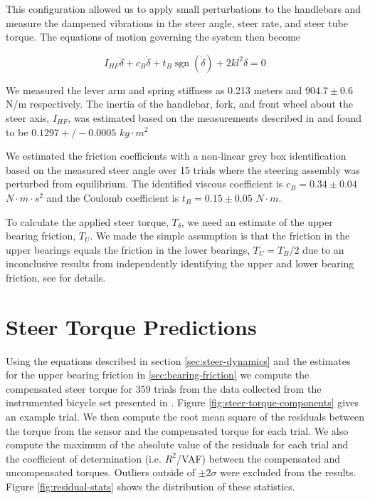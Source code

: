 \documentclass[a4paper]{article}
\begin{document}
This configuration allowed us to apply small perturbations to the handlebars
and measure the dampened vibrations in the steer angle, steer rate, and steer
tube torque. The equations of motion governing the system then become

\begin{equation}
  I_{HF} \ddot{\delta} + c_B \dot{\delta} + t_B
  \operatorname{sgn}(\dot{\delta}) + 2 k l^2 \delta = 0
\end{equation}

We measured the lever arm and spring stiffness as 0.213 meters and $904.7 \pm
0.6$ N/m respectively. The inertia of the handlebar, fork, and front wheel
about the steer axis, $I_{HF}$, was estimated based on the measurements
described in \cite{Moore2012} and found to be $0.1297+/-0.0005$ $kg\cdot m^2$

We estimated the friction coefficients with a non-linear grey box
identification based on the measured steer angle over 15 trials where the
steering assembly was perturbed from equilibrium. The identified viscous
coefficient is $c_B = 0.34 \pm 0.04$ $N \cdot m \cdot s^2$ and the Coulomb
coefficient is $t_B = 0.15 \pm 0.05$ $N \cdot m$.

To calculate the applied steer torque, $T_\delta$, we need an estimate of the
upper bearing friction, $T_U$. We made the simple assumption is that the
friction in the upper bearings equals the friction in the lower bearings, $T_U
= T_B / 2$ due to an inconclusive results from independently identifying the
upper and lower bearing friction, see \cite{Moore2012} for details.

\section*{Steer Torque Predictions}

Using the equations described in section \ref{sec:steer-dynamics} and the
estimates for the upper bearing friction in \ref{sec:bearing-friction} we
compute the compensated steer torque for 359 trials from the data collected
from the instrumented bicycle set presented in \cite{Moore1012}. Figure
\ref{fig:steer-torque-components} gives an example trial. We then compute the
root mean square of the residuals between the torque from the sensor and the
compensated torque for each trial. We also compute the maximum of the absolute
value of the residuals for each trial and the coefficient of determination
(i.e. $R^2$/VAF) between the compensated and uncompensated torques. Outliers
outside of $\pm2 \sigma$ were excluded from the results. Figure
\ref{fig:residual-stats} shows the distribution of these statistics.
\end{document}
